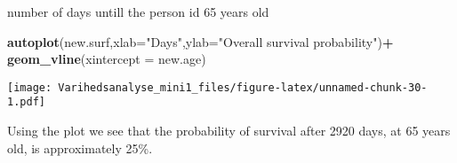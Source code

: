 \documentclass[
]{article}
\newenvironment{Shaded}{\begin{snugshade}}{\end{snugshade}}
\newcommand{\DataTypeTok}[1]{\textcolor[rgb]{0.13,0.29,0.53}{#1}}
\newcommand{\KeywordTok}[1]{\textcolor[rgb]{0.13,0.29,0.53}{\textbf{#1}}}
\newcommand{\NormalTok}[1]{#1}
\newcommand{\OperatorTok}[1]{\textcolor[rgb]{0.81,0.36,0.00}{\textbf{#1}}}
\newcommand{\StringTok}[1]{\textcolor[rgb]{0.31,0.60,0.02}{#1}}
\begin{document}
number of days untill the person id 65 years old

\begin{Shaded}
\begin{Highlighting}[]
\KeywordTok{autoplot}\NormalTok{(new.surf,}\DataTypeTok{xlab=}\StringTok{"Days"}\NormalTok{,}\DataTypeTok{ylab=}\StringTok{"Overall survival probability"}\NormalTok{)}\OperatorTok{+}
\StringTok{  }\KeywordTok{geom_vline}\NormalTok{(}\DataTypeTok{xintercept =}\NormalTok{ new.age)}
\end{Highlighting}
\end{Shaded}

\texttt{[image: Varihedsanalyse\_mini1\_files/figure-latex/unnamed-chunk-30-1.pdf]}

Using the plot we see that the probability of survival after 2920 days,
at 65 years old, is approximately 25\%.
\end{document}
